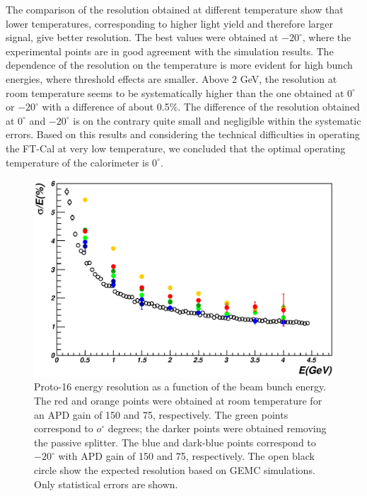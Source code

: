 The comparison of the resolution obtained at different temperature
show that lower temperatures, corresponding to higher light yield and
therefore larger signal, give better resolution. The best values were
obtained at $-20^{\circ}$, where the experimental points are in good
agreement with the simulation results. The dependence of the
resolution on the temperature is more evident for high bunch energies,
where threshold effects are smaller. Above 2 GeV, the resolution at
room temperature seems to be systematically higher than the one
obtained at $0^\circ$ or $-20^\circ$ with a difference of about
0.5\%. The difference of the resolution obtained at $0^\circ$ and $-20^\circ$ 
is on the contrary quite small and negligible within the systematic
errors. Based on this results and considering the technical
difficulties in operating the FT-Cal at very low temperature, we
concluded that the optimal operating temperature of the calorimeter is
$0^\circ$.

\begin{figure}
\includegraphics[width=1.0\columnwidth]{./fig/btf_resolution.eps}
\caption{Proto-16 energy resolution  as a function of the beam bunch
  energy. The red and orange points were obtained at room temperature
  for an APD gain of 150 and 75, respectively. The green points
  correspond to $o^\circ$ degrees; the darker points were obtained
  removing the passive splitter. The blue and dark-blue points
  correspond to $-20^\circ$ with APD gain of 150 and 75,
  respectively. The open black circle show the expected resolution
  based on GEMC simulations. Only statistical errors are shown.}
\label{fig:btf_resolution}
\end{figure} 
